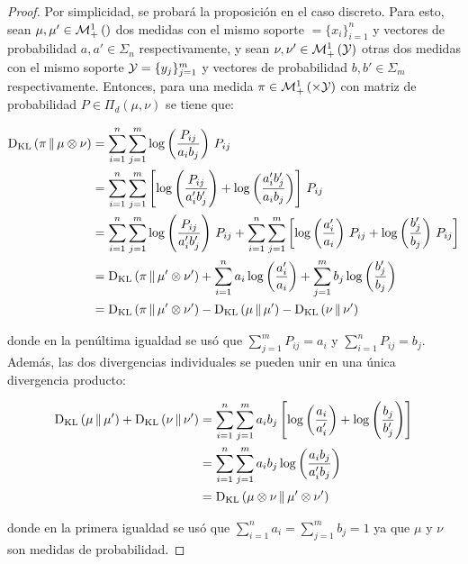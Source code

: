 \begin{proof}
	Por simplicidad, se probará la proposición en el caso discreto. Para esto, sean $\mu,\mu'\in\mathcal{M}_+^1\left(\right)$ dos medidas con el mismo soporte $\xspace=\{x_i\}_{i=1}^n$ y vectores de probabilidad $a,a'\in\Sigma_n$ respectivamente, y sean $\nu,\nu'\in\mathcal{M}_+^1\left(\mathcal{Y}\right)$ otras dos medidas con el mismo soporte $\mathcal{Y}=\{y_j\}_{j=1}^m$ y vectores de probabilidad $b,b'\in\Sigma_m$ respectivamente. Entonces, para una medida $\pi\in\probmeasure{\xspace\times\yspace}$ con matriz de probabilidad $P\in\Pi_d(\mu,\nu)$ se tiene que:

	\begin{align*}
		\operatorname{D_{KL}}\left(\pi\,\|\,\mu\otimes\nu\right) & = \sum_{i=1}^n \sum_{j=1}^m \log\left(\frac{P_{ij}}{a_i b_j}\right)\, P_{ij}                                                                                                                                \\
		                        & =\sum_{i=1}^n \sum_{j=1}^m \left[\log\left(\frac{P_{ij}}{a'_i b'_j}\right) + \log\left(\frac{a'_i b'_j}{a_i b_j}\right)\right]\, P_{ij}                                                                         \\
		                        & = \sum_{i=1}^n \sum_{j=1}^m \log\left(\frac{P_{ij}}{a'_i b'_j}\right) \, P_{ij} + \sum_{i=1}^n \sum_{j=1}^m \left[\log\left(\frac{a'_i}{a_i}\right) \, P_{ij} + \log\left(\frac{b'_j}{b_j}\right) \, P_{ij} \right] \\
		                        & = \operatorname{D_{KL}}\left(\pi\,\|\,\mu'\otimes\nu'\right) + \sum_{i=1}^n a_i \log\left(\frac{a'_i}{a_i}\right) + \sum_{j=1}^m b_j \log\left(\frac{b'_j}{b_j}\right)                                                                           \\
		                        & = \operatorname{D_{KL}}\left(\pi\,\|\,\mu'\otimes\nu'\right) - \operatorname{D_{KL}}\left(\mu\,\|\,\mu'\right) - \operatorname{D_{KL}}\left(\nu\,\|\,\nu'\right)
	\end{align*}

	donde en la penúltima igualdad se usó que $\sum_{j=1}^m P_{ij} = a_i$ y $\sum_{i=1}^n P_{ij} = b_j$. Además, las dos divergencias individuales se pueden unir en una única divergencia producto:

	\begin{align*}
		\operatorname{D_{KL}}\left(\mu\,\|\,\mu'\right) + \operatorname{D_{KL}}\left(\nu\,\|\,\nu'\right) & = \sum_{i=1}^n \sum_{j=1}^m a_i b_j \left[\log\left(\frac{a_i}{a'_i}\right) + \log\left(\frac{b_j}{b'_j}\right)\right] \\
		                                & = \sum_{i=1}^n \sum_{j=1}^m a_i b_j \log\left(\frac{a_i b_j}{a'_i b_j}\right)                                      \\
		                                & = \operatorname{D_{KL}}\left(\mu\otimes\nu\,\|\,\mu'\otimes\nu'\right)
	\end{align*}

	donde en la primera igualdad se usó que $\sum_{i=1}^n a_i = \sum_{j=1}^m b_j = 1$ ya que $\mu$ y $\nu$ son medidas de probabilidad.
\end{proof}

